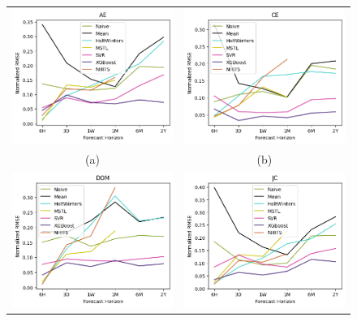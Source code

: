 \documentclass[sigconf]{acmart}
\begin{document}
  \begin{figure}
\begin{tabular}{cc}
  \includegraphics[width=65mm]{Images/NRMSE_Zone_AE.png} &  \includegraphics[width=65mm]{Images/NRMSE_Zone_CE.png} \\
(a) & (b) \\[6pt]
 \includegraphics[width=65mm]{Images/NRMSE_Zone_DOM.png} &  \includegraphics[width=65mm]{Images/NRMSE_Zone_JC.png} \\

\end{tabular}
\end{figure}
\end{document}
